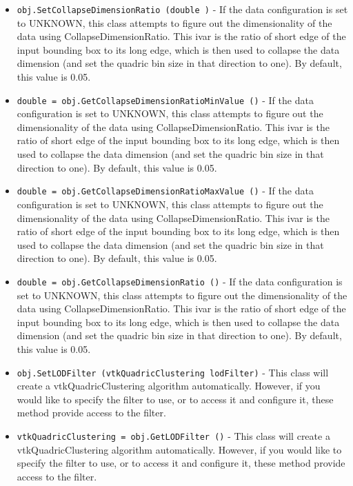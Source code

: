 \begin{itemize}
\item  \verb|obj.SetCollapseDimensionRatio (double )| -  If the data configuration is set to UNKNOWN, this class attempts to
 figure out the dimensionality of the data using CollapseDimensionRatio.
 This ivar is the ratio of short edge of the input bounding box to its
 long edge, which is then used to collapse the data dimension (and set the
 quadric bin size in that direction to one). By default, this value is 0.05.

\item  \verb|double = obj.GetCollapseDimensionRatioMinValue ()| -  If the data configuration is set to UNKNOWN, this class attempts to
 figure out the dimensionality of the data using CollapseDimensionRatio.
 This ivar is the ratio of short edge of the input bounding box to its
 long edge, which is then used to collapse the data dimension (and set the
 quadric bin size in that direction to one). By default, this value is 0.05.

\item  \verb|double = obj.GetCollapseDimensionRatioMaxValue ()| -  If the data configuration is set to UNKNOWN, this class attempts to
 figure out the dimensionality of the data using CollapseDimensionRatio.
 This ivar is the ratio of short edge of the input bounding box to its
 long edge, which is then used to collapse the data dimension (and set the
 quadric bin size in that direction to one). By default, this value is 0.05.

\item  \verb|double = obj.GetCollapseDimensionRatio ()| -  If the data configuration is set to UNKNOWN, this class attempts to
 figure out the dimensionality of the data using CollapseDimensionRatio.
 This ivar is the ratio of short edge of the input bounding box to its
 long edge, which is then used to collapse the data dimension (and set the
 quadric bin size in that direction to one). By default, this value is 0.05.

\item  \verb|obj.SetLODFilter (vtkQuadricClustering lodFilter)| -  This class will create a vtkQuadricClustering algorithm automatically.
 However, if you would like to specify the filter to use, or to access it
 and configure it, these method provide access to the filter.

\item  \verb|vtkQuadricClustering = obj.GetLODFilter ()| -  This class will create a vtkQuadricClustering algorithm automatically.
 However, if you would like to specify the filter to use, or to access it
 and configure it, these method provide access to the filter.


\end{itemize}
